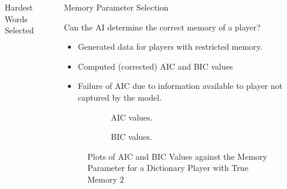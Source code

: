 \documentclass[final]{beamer}
\begin{document}
{\begin{frame}{}
\begin{center}
\begin{columns}[t]
\begin{column}{0.32\textwidth}
\begin{block}{\huge Hardest Words Selected}
    \end{block}


\end{column}

\begin{column}{0.32\textwidth}

       \begin{block}{\huge Memory Parameter Selection}

\vspace{1cm}
{\Large Can the AI determine the correct memory of a player?}
\begin{itemize}
\item Generated data for players with restricted memory.
\item Computed (corrected) AIC and BIC values
\item Failure of AIC due to information available to player not captured by the model.
\end{itemize}

\vspace{1cm}

\begin{figure}
	\begin{subfigure}[b]{.45\textwidth}
\begin{center}
		\caption{AIC values.}
\end{center}
	\end{subfigure}
\hspace{1cm}
	\begin{subfigure}[b]{.45\textwidth}
\begin{center}
		\caption{BIC values.}
\end{center}
	\end{subfigure}
\hfill
	\caption{Plots of AIC and BIC Values against the Memory Parameter for a Dictionary Player with True Memory $2$}	
\end{figure}
    \end{block}


\end{column}
\end{columns}
\end{center}
\end{frame}}
\end{document}

